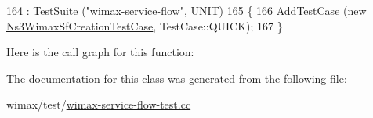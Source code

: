 \begin{DoxyCode}
164   : \hyperlink{classns3_1_1TestSuite_a904b0c40583b744d30908aeb94636d1a}{TestSuite} (\textcolor{stringliteral}{"wimax-service-flow"}, \hyperlink{classns3_1_1TestSuite_a1ebfcab34ec8161e085e8e3a1855eae0a3885375a3787abf60431f8454b3cadbd}{UNIT})
165 \{
166   \hyperlink{classns3_1_1TestCase_a3718088e3eefd5d6454569d2e0ddd835}{AddTestCase} (\textcolor{keyword}{new} \hyperlink{classNs3WimaxSfCreationTestCase}{Ns3WimaxSfCreationTestCase}, TestCase::QUICK);
167 \}
\end{DoxyCode}


Here is the call graph for this function\+:




The documentation for this class was generated from the following file\+:\begin{DoxyCompactItemize}
\item 
wimax/test/\hyperlink{wimax-service-flow-test_8cc}{wimax-\/service-\/flow-\/test.\+cc}\end{DoxyCompactItemize}
